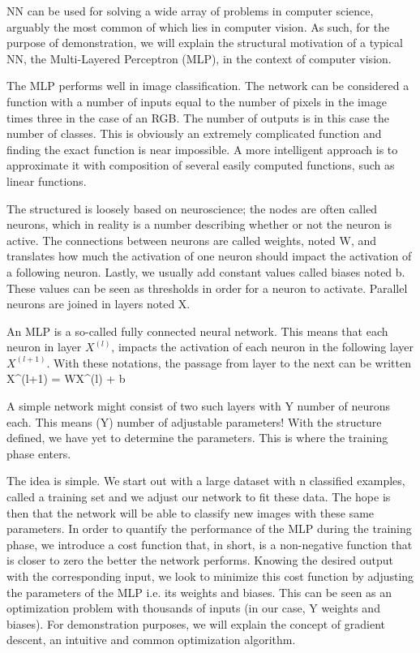 \startsection[title=Classical Neural Networks ({\small Multilayer Perceptron})]
NN can be used for solving a wide array of problems in computer science, arguably the most common of which lies in computer vision.
 As such, for the purpose of demonstration, we will explain the structural motivation of a typical NN, the Multi-Layered Perceptron (MLP), in the context of computer vision.  

The MLP performs well in image classification. 
The network can be considered a function with a number of inputs equal to the number of pixels in the image times three in the case of an RGB.
The number of outputs is in this case the number of classes.
This is obviously an extremely complicated function and finding the exact function is near impossible.
A more intelligent approach is to approximate it with composition of several easily computed functions, such as linear functions.


The structured is loosely based on neuroscience; the nodes are often called neurons, which in reality is a number describing whether or not the neuron is active.
The connections between neurons are called weights, noted W, and translates how much the activation of one neuron should impact the activation of a following neuron.
Lastly, we usually add constant values called biases noted b. 
These values can be seen as thresholds in order for a neuron to activate. 
Parallel neurons are joined in layers noted X.

An MLP is a so-called fully connected neural network. 
This means that each neuron in layer $X^(l)$, impacts the activation of each neuron in the following layer $X^(l+1)$.
With these notations, the passage from layer to the next can be written
\startformula
X^(l+1) = WX^(l) + b
\stopformula
  
A simple network might consist of two such layers with Y number of neurons each.
This means (Y) number of adjustable parameters! With the structure defined, we have yet to determine the parameters.
This is where the training phase enters.  

\startsubsection[title=Training phase]
The idea is simple. We start out with a large dataset with n classified examples, called a training set and we adjust our network to fit these data.
The hope is then that the network will be able to classify new images with these same parameters.
In order to quantify the performance of the MLP during the training phase, we introduce a cost function that, in short, is a non-negative function that is closer to zero the better the network performs.
Knowing the desired output with the corresponding input, we look to minimize this cost function by adjusting the parameters of the MLP i.e. its weights and biases.
This can be seen as an optimization problem with thousands of inputs (in our case, Y weights and biases).
For demonstration purposes, we will explain the concept of gradient descent, an intuitive and common optimization algorithm.  
\stopsubsection

